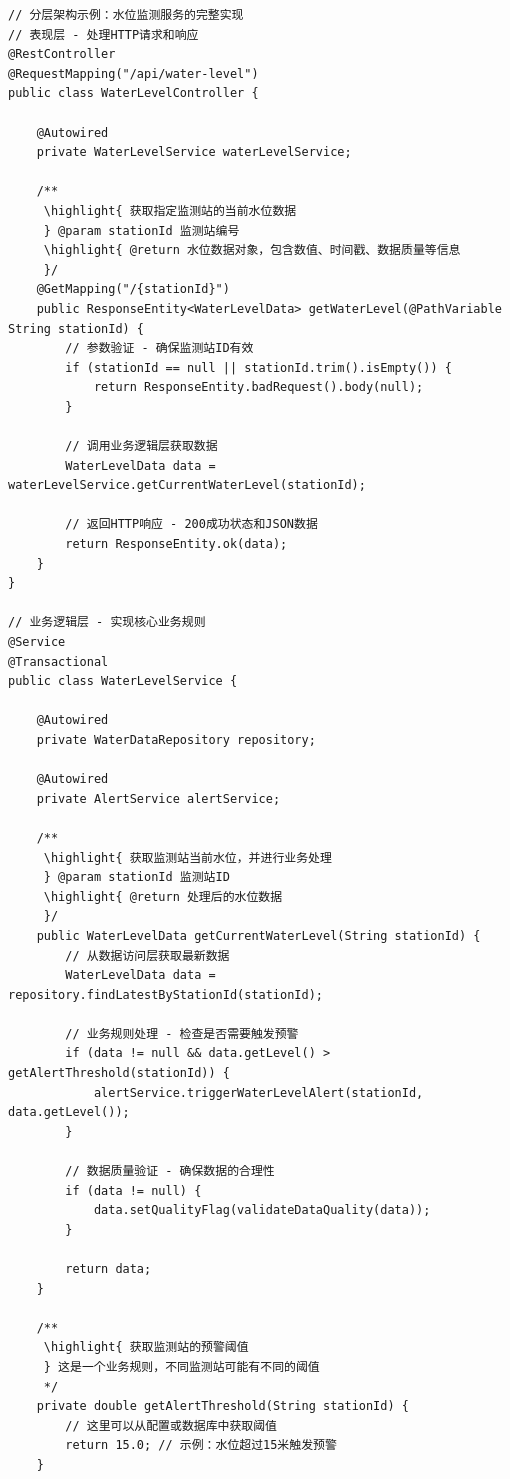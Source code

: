 \begin{lstlisting}[style=java]
// 分层架构示例：水位监测服务的完整实现
// 表现层 - 处理HTTP请求和响应
@RestController
@RequestMapping("/api/water-level")
public class WaterLevelController {
    
    @Autowired
    private WaterLevelService waterLevelService;
    
    /**
     \highlight{ 获取指定监测站的当前水位数据
     } @param stationId 监测站编号
     \highlight{ @return 水位数据对象，包含数值、时间戳、数据质量等信息
     }/
    @GetMapping("/{stationId}")
    public ResponseEntity<WaterLevelData> getWaterLevel(@PathVariable String stationId) {
        // 参数验证 - 确保监测站ID有效
        if (stationId == null || stationId.trim().isEmpty()) {
            return ResponseEntity.badRequest().body(null);
        }
        
        // 调用业务逻辑层获取数据
        WaterLevelData data = waterLevelService.getCurrentWaterLevel(stationId);
        
        // 返回HTTP响应 - 200成功状态和JSON数据
        return ResponseEntity.ok(data);
    }
}

// 业务逻辑层 - 实现核心业务规则
@Service
@Transactional
public class WaterLevelService {
    
    @Autowired
    private WaterDataRepository repository;
    
    @Autowired
    private AlertService alertService;
    
    /**
     \highlight{ 获取监测站当前水位，并进行业务处理
     } @param stationId 监测站ID
     \highlight{ @return 处理后的水位数据
     }/
    public WaterLevelData getCurrentWaterLevel(String stationId) {
        // 从数据访问层获取最新数据
        WaterLevelData data = repository.findLatestByStationId(stationId);
        
        // 业务规则处理 - 检查是否需要触发预警
        if (data != null && data.getLevel() > getAlertThreshold(stationId)) {
            alertService.triggerWaterLevelAlert(stationId, data.getLevel());
        }
        
        // 数据质量验证 - 确保数据的合理性
        if (data != null) {
            data.setQualityFlag(validateDataQuality(data));
        }
        
        return data;
    }
    
    /**
     \highlight{ 获取监测站的预警阈值
     } 这是一个业务规则，不同监测站可能有不同的阈值
     */
    private double getAlertThreshold(String stationId) {
        // 这里可以从配置或数据库中获取阈值
        return 15.0; // 示例：水位超过15米触发预警
    }
    

\end{lstlisting}
